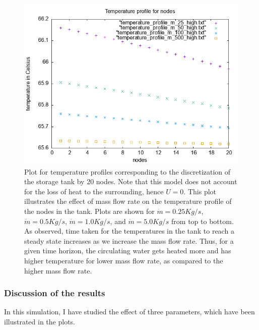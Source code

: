 \documentclass{article}
\begin{document}
\begin{figure}[ht]
\centering
\includegraphics{temperature_profile_m_dot.png}
\caption{Plot for temperature profiles corresponding to the discretization of the storage tank by 20 nodes. Note that this model does not account for the loss of heat to the surrounding, hence $U = 0$. This plot illustrates the effect of mass flow rate on the temperature profile of the nodes in the tank.  Plots are shown for $\dot{m} = 0.25 Kg/s$, $\dot{m} = 0.5 Kg/s$, $\dot{m} = 1.0 Kg/s$, and $\dot{m} = 5.0 Kg/s$ from top to bottom. As observed, time taken for the temperatures in the tank to reach a steady state increases as we increase the mass flow rate.  Thus, for a given time horizon, the circulating water gets heated more and has higher temperature for lower mass flow rate, as compared to the higher mass flow rate. }
\end{figure}

\newpage
\subsubsection*{Discussion of the results}
In this simulation, I have studied the effect of three parameters, which have been illustrated in the plots.
\end{document}

